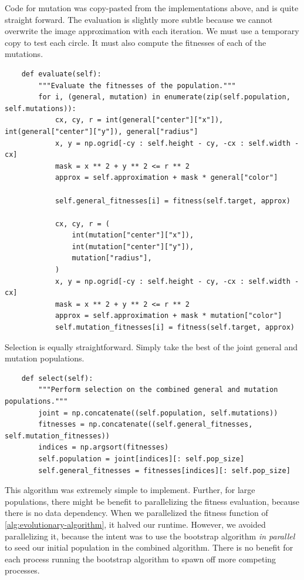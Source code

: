 \documentclass{article}
\begin{document}
Code for mutation was copy-pasted from the implementations above, and is quite straight forward.
The evaluation is slightly more subtle because we cannot overwrite the image approximation with
each iteration. We must use a temporary copy to test each circle. It must also compute the
fitnesses of each of the mutations.

\begin{verbatim}
    def evaluate(self):
        """Evaluate the fitnesses of the population."""
        for i, (general, mutation) in enumerate(zip(self.population, self.mutations)):
            cx, cy, r = int(general["center"]["x"]), int(general["center"]["y"]), general["radius"]
            x, y = np.ogrid[-cy : self.height - cy, -cx : self.width - cx]
            mask = x ** 2 + y ** 2 <= r ** 2
            approx = self.approximation + mask * general["color"]

            self.general_fitnesses[i] = fitness(self.target, approx)

            cx, cy, r = (
                int(mutation["center"]["x"]),
                int(mutation["center"]["y"]),
                mutation["radius"],
            )
            x, y = np.ogrid[-cy : self.height - cy, -cx : self.width - cx]
            mask = x ** 2 + y ** 2 <= r ** 2
            approx = self.approximation + mask * mutation["color"]
            self.mutation_fitnesses[i] = fitness(self.target, approx)
\end{verbatim}

Selection is equally straightforward. Simply take the best of the joint general and mutation
populations.

\begin{verbatim}
    def select(self):
        """Perform selection on the combined general and mutation populations."""
        joint = np.concatenate((self.population, self.mutations))
        fitnesses = np.concatenate((self.general_fitnesses, self.mutation_fitnesses))
        indices = np.argsort(fitnesses)
        self.population = joint[indices][: self.pop_size]
        self.general_fitnesses = fitnesses[indices][: self.pop_size]
\end{verbatim}

This algorithm was extremely simple to implement. Further, for large populations, there might be
benefit to parallelizing the fitness evaluation, because there is no data dependency. When we
parallelized the fitness function of \autoref{alg:evolutionary-algorithm}, it halved our runtime.
However, we avoided parallelizing it, because the intent was to use the bootstrap algorithm
\textit{in parallel} to seed our initial population in the combined algorithm. There is no benefit
for each process running the bootstrap algorithm to spawn off more competing processes.
\end{document}
